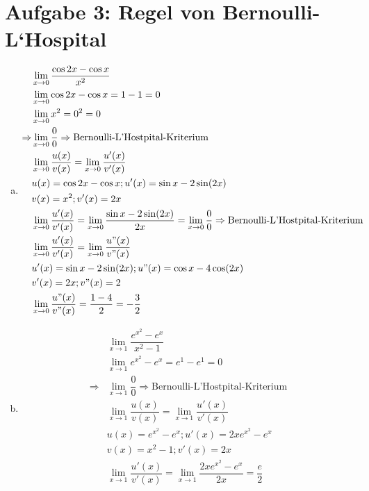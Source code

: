 \documentclass[
    10pt,
    parskip=half-,
    paper=a4,
    english,ngerman,
    fleqn
]{scrartcl}
\begin{document}
\section*{Aufgabe 3: Regel von Bernoulli-L`Hospital}
\newcommand{\limZ}{\lim_{x\to 0}}
\newcommand{\limTo}[1]{\lim_{x\to#1}}
\newcommand{\bern}{\Rightarrow\text{Bernoulli-L'Hostpital-Kriterium}}
\begin{enumerate}[a)]
\item
    \begin{align*}
        &\lim_{x\to 0} \dfrac{\cos 2x-\cos x}{x^2}\\
        &\lim_{x\to 0} \cos 2x-\cos x = 1-1 = 0\\
        &\lim_{x\to 0} x^2 = 0^2 = 0\\
        \Rightarrow &\lim_{x\to 0} \dfrac{0}{0} \bern\\
        &\lim_{x\to 0} \dfrac{u(x)}{v(x)} = \limZ \dfrac{u'(x)}{v'(x)}\\
        &u(x) = \cos 2x-\cos x; u'(x) = \sin x-2\sin(2x)\\
        &v(x) = x^2; v'(x) = 2x\\
        &\limZ \dfrac{u'(x)}{v'(x)}
            = \limZ \dfrac{\sin x-2\sin(2x)}{2x} = \limZ \dfrac{0}{0} \bern\\
        &\limZ \dfrac{u'(x)}{v'(x)} = \limZ \dfrac{u"(x)}{v"(x)}\\
        &u'(x) = \sin x - 2\sin(2x); u"(x) = \cos x - 4\cos(2x)\\
        &v'(x) = 2x; v"(x) = 2\\
        &\limZ \dfrac{u"(x)}{v"(x)} = \dfrac{1-4}{2} = -\dfrac{3}{2}\\
    \end{align*}
\item
    \begin{align*}
        &\limTo{1} \dfrac{e^{x^2}-e^x}{x^2-1}\\
        &\limTo{1} e^{x^2}-e^x = e^1-e^1 = 0\\
        \Rightarrow &\limTo{1} \dfrac{0}{0} \bern\\
        &\limTo{1} \dfrac{u(x)}{v(x)} = \limTo{1} \dfrac{u'(x)}{v'(x)}\\
        &u(x) = e^{x^2}-e^x; u'(x) = 2xe^{x^2}-e^x\\
        &v(x) = x^2-1; v'(x) = 2x\\
        &\limTo{1} \dfrac{u'(x)}{v'(x)} = \limTo{1} \dfrac{2xe^{x^2}-e^x}{2x}
            = \dfrac{e}{2}\\
    \end{align*}

\end{enumerate}
\end{document}
